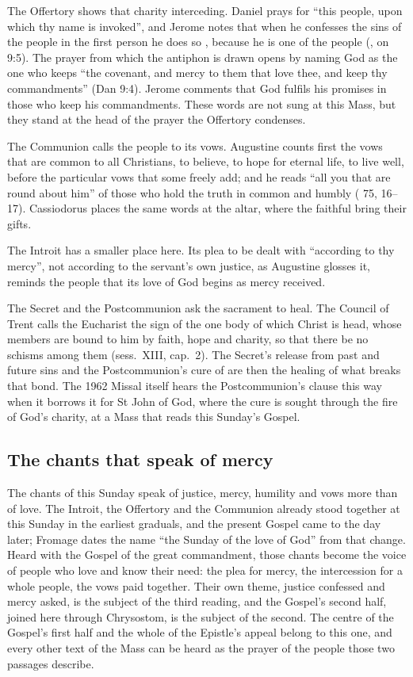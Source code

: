 The Offertory shows that charity interceding. Daniel prays for ``this people,
upon which thy name is invoked'', and Jerome notes that when he confesses the
sins of the people in the first person he does so , because he is one of the people (, on
9:5). The prayer from which the antiphon is drawn opens by naming God as the
one who keeps ``the covenant, and mercy to them that love thee, and keep thy
commandments'' (Dan 9:4). Jerome comments that God fulfils his promises in
those who keep his commandments. These words are not sung at this Mass, but
they stand at the head of the prayer the Offertory condenses.

The Communion calls the people to its vows. Augustine counts first the vows
that are common to all Christians, to believe, to hope for eternal life, to
live well, before the particular vows that some freely add; and he
reads ``all you that are round about him'' of those who hold the truth in
common and humbly ( 75, 16--17). Cassiodorus places
the same words at the altar, where the faithful bring their gifts.

The Introit has a smaller place here. Its plea to be dealt with ``according
to thy mercy'', not according to the servant's own justice, as Augustine
glosses it, reminds the people that its love of God begins as mercy received.

The Secret and the Postcommunion ask the sacrament to heal. The Council of
Trent calls the Eucharist the sign of the one body of which Christ is head,
whose members are bound to him by faith, hope and charity, so that there be no
schisms among them (sess.~XIII, cap.~2). The Secret's release from past and
future sins and the Postcommunion's cure of  are then the
healing of what breaks that bond. The 1962 Missal itself hears the
Postcommunion's clause this way when it borrows it for St John of God, where
the cure is sought through the fire of God's charity, at a Mass that reads
this Sunday's Gospel.

\subsection{The chants that speak of mercy}

The chants of this Sunday speak of justice, mercy, humility and vows more
than of love. The Introit, the Offertory and the Communion already stood
together at this Sunday in the earliest graduals, and the present Gospel came
to the day later; Fromage dates the name ``the Sunday of the love of God''
from that change. Heard with the Gospel of the great commandment, those chants
become the voice of people who love and know their need: the plea for mercy,
the intercession for a whole people, the vows paid together. Their own theme,
justice confessed and mercy asked, is the subject of the third reading, and
the Gospel's second half, joined here through Chrysostom, is the subject of
the second. The centre of the Gospel's first half and the whole of the
Epistle's appeal belong to this one, and every other text of the Mass can be
heard as the prayer of the people those two passages describe.

